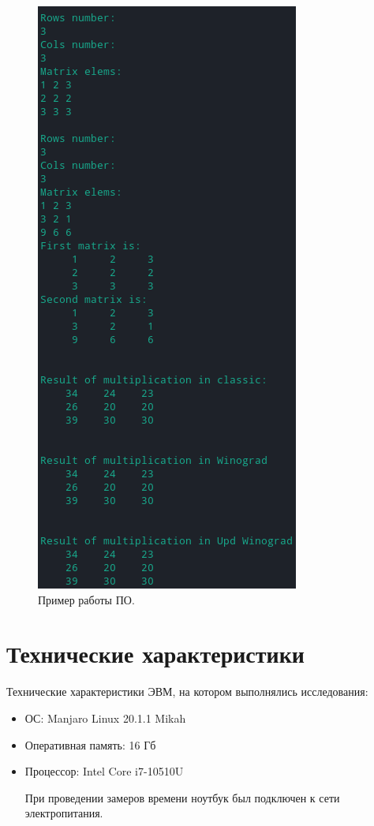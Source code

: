 \documentclass[12pt]{report}
\begin{document}
\begin{figure}
\begin{center}
\includegraphics[scale=0.9]{inc/img/inpExample.png}
\captionsetup{justification=centering}
	\caption{Пример работы ПО.}
	\label{img:exampleInp}	
\end{center}
\end{figure}

\newpage

\section{Технические характеристики}
Технические характеристики ЭВМ, на котором выполнялись исследования:
\begin{itemize}
\item ОС: Manjaro Linux 20.1.1 Mikah
\item Оперативная память: 16 Гб
\item Процессор: Intel Core i7-10510U

При проведении замеров времени ноутбук был подключен к сети электропитания.
\end{itemize}
\end{document}

